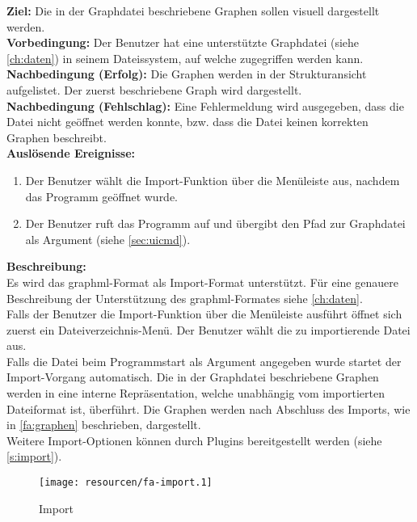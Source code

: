 \label{fa:import}
\textbf{Ziel:} Die in der Graphdatei beschriebene Graphen sollen visuell dargestellt werden.\\
\textbf{Vorbedingung:} Der Benutzer hat eine unterstützte Graphdatei (siehe \autoref{ch:daten}) in seinem Dateissystem, auf welche zugegriffen werden kann.\\
\textbf{Nachbedingung (Erfolg):} Die Graphen werden in der Strukturansicht aufgelistet. Der zuerst beschriebene Graph wird dargestellt.\\
\textbf{Nachbedingung (Fehlschlag):}
Eine Fehlermeldung wird ausgegeben, dass die Datei nicht geöffnet werden konnte, bzw. dass die Datei keinen korrekten Graphen beschreibt.\\
\textbf{Auslösende Ereignisse:}
\begin{enumerate}[nolistsep, label=(\alph*)]
  \item Der Benutzer wählt die Import-Funktion über die Menüleiste aus, nachdem das Programm geöffnet wurde. %
  \item Der Benutzer ruft das Programm auf und übergibt den Pfad zur Graphdatei als Argument (siehe \autoref{sec:uicmd}).
\end{enumerate}
\textbf{Beschreibung:}\\
Es wird das \gls{graphml}-Format als Import-Format unterstützt. Für eine genauere Beschreibung der Unterstützung des \gls{graphml}-Formates siehe \autoref{ch:daten}.\\
Falls der Benutzer die Import-Funktion über die Menüleiste ausführt öffnet sich zuerst ein Dateiverzeichnis-Menü.
Der Benutzer wählt die zu importierende Datei aus.\\
Falls die Datei beim Programmstart als Argument angegeben wurde startet der Import-Vorgang automatisch.
Die in der Graphdatei beschriebene Graphen werden in eine interne Repräsentation, welche unabhängig vom importierten Dateiformat ist, überführt. %
Die Graphen werden nach Abschluss des Imports, wie in \ref{fa:graphen} beschrieben, dargestellt.\\
Weitere Import-Optionen können durch Plugins bereitgestellt werden (siehe \ref{s:import}).

\begin{figure}[ht]
  \centering
  \texttt{[image: resourcen/fa-import.1]}
  \caption{Import}
  \label{fig:import}
\end{figure} %

